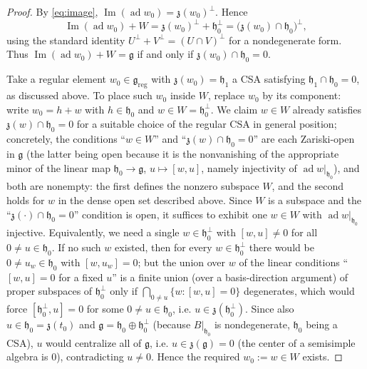 \documentclass{amsart}
\theoremstyle{definition}
\begin{document}
\begin{proof}
By \eqref{eq:image}, $\operatorname{Im}(\operatorname{ad}w_0)=\mathfrak z(w_0)^{\perp}$.
Hence
\[
  \operatorname{Im}(\operatorname{ad}w_0)+W
  =\mathfrak z(w_0)^{\perp}+\mathfrak h_0^{\perp}
  =\bigl(\mathfrak z(w_0)\cap\mathfrak h_0\bigr)^{\perp},
\]
using the standard identity $U^{\perp}+V^{\perp}=(U\cap V)^{\perp}$ for a
nondegenerate form. Thus $\operatorname{Im}(\operatorname{ad}w_0)+W=\mathfrak g$ if
and only if $\mathfrak z(w_0)\cap\mathfrak h_0=0$.

Take a regular element $w_0\in\mathfrak g_{\mathrm{reg}}$ with
$\mathfrak z(w_0)=\mathfrak h_1$ a CSA satisfying $\mathfrak h_1\cap\mathfrak h_0=0$,
as discussed above. To place such $w_0$ inside $W$, replace $w_0$ by its component:
write $w_0=h+w$ with $h\in\mathfrak h_0$ and $w\in W=\mathfrak h_0^{\perp}$. We claim
$w\in W$ already satisfies $\mathfrak z(w)\cap\mathfrak h_0=0$ for a suitable choice
of the regular CSA in general position; concretely, the conditions
``$w\in W$'' and ``$\mathfrak z(w)\cap\mathfrak h_0=0$'' are each Zariski-open in
$\mathfrak g$ (the latter being open because it is the nonvanishing of the
appropriate minor of the linear map $\mathfrak h_0\to\mathfrak g$,
$u\mapsto[w,u]$, namely injectivity of $\operatorname{ad}w|_{\mathfrak h_0}$), and
both are nonempty: the first defines the nonzero subspace $W$, and the second holds
for $w$ in the dense open set described above. Since $W$ is a subspace and the
``$\mathfrak z(\cdot)\cap\mathfrak h_0=0$'' condition is open, it suffices to exhibit
one $w\in W$ with $\operatorname{ad}w|_{\mathfrak h_0}$ injective. Equivalently, we
need a single $w\in\mathfrak h_0^{\perp}$ with $[w,u]\neq0$ for all
$0\neq u\in\mathfrak h_0$. If no such $w$ existed, then for every
$w\in\mathfrak h_0^{\perp}$ there would be $0\ne u_w\in\mathfrak h_0$ with
$[w,u_w]=0$; but the union over $w$ of the linear conditions
``$[w,u]=0$ for a fixed $u$'' is a finite union (over a basis-direction
argument) of proper subspaces of $\mathfrak h_0^{\perp}$ only if
$\bigcap_{0\ne u}\{w:[w,u]=0\}$ degenerates, which would force
$[\mathfrak h_0^{\perp},u]=0$ for some $0\ne u\in\mathfrak h_0$, i.e.
$u\in\mathfrak z(\mathfrak h_0^{\perp})$. Since also $u\in\mathfrak h_0=
\mathfrak z(t_0)$ and $\mathfrak g=\mathfrak h_0\oplus\mathfrak h_0^{\perp}$
(because $B|_{\mathfrak h_0}$ is nondegenerate, $\mathfrak h_0$ being a CSA), $u$
would centralize all of $\mathfrak g$, i.e. $u\in\mathfrak z(\mathfrak g)=0$
(the center of a semisimple algebra is $0$), contradicting $u\neq0$. Hence the
required $w_0:=w\in W$ exists.
\end{proof}
\end{document}
